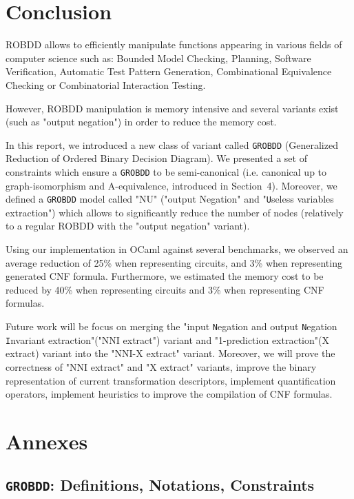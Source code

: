 \documentclass[a4paper,10pt]{article}
\newcommand{\Uextract}{"\texttt{U}seless variables extraction"}
\newcommand{\NNIextract}{"input \texttt{N}egation and output \texttt{N}egation \texttt{I}nvariant extraction"}
\newcommand{\Xextract}{"1-prediction extraction"}
\newcommand{\GroBdd}{\texttt{GROBDD}}
\begin{document}
\section{Conclusion}

ROBDD allows to efficiently manipulate functions appearing in various fields of computer science such as: Bounded Model Checking, Planning, Software Verification, Automatic Test Pattern Generation, Combinational Equivalence Checking or Combinatorial Interaction Testing.

However, ROBDD manipulation is memory intensive and several variants exist (such as "output negation") in order to reduce the memory cost.

In this report, we introduced a new class of variant called \GroBdd{} (Generalized Reduction of Ordered Binary Decision Diagram). We presented a set of constraints which ensure a \GroBdd{} to be semi-canonical (i.e. canonical up to graph-isomorphism and A-equivalence, introduced in Section~4).
Moreover, we defined a \GroBdd{} model called "NU" ("output Negation" and \Uextract) which allows to significantly reduce the number of nodes (relatively to a regular ROBDD with the "output negation" variant).


Using our implementation in OCaml against several benchmarks, we observed an average reduction of 25\% when representing circuits, and 3\% when representing generated CNF formula.
Furthermore, we estimated the memory cost to be reduced by 40\% when representing circuits and 3\% when representing CNF formulas.


Future work will be focus on merging the \NNIextract ("NNI extract") variant and \Xextract (X extract) variant into the "NNI-X extract" variant.
Moreover, we will prove the correctness of "NNI extract" and "X extract" variants, improve the binary representation of current transformation descriptors, implement quantification operators, implement heuristics to improve the compilation of CNF formulas.


\newpage
{}


\newpage
\tableofcontents

\newpage

\section{Annexes}

\subsection{\GroBdd{}: Definitions, Notations, Constraints\label{grobdd-def}}
\end{document}
